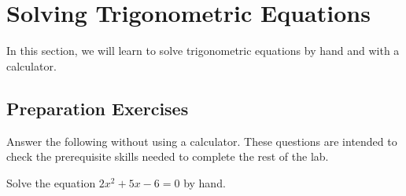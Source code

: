 
\section{Solving Trigonometric Equations} \label{section-solving-trig-equations}
In this section, we will learn to solve trigonometric equations by hand and with a calculator.


\subsection*{Preparation Exercises} \label{preparation-exercises-section-solving-trig-equations}
Answer the following without using a calculator. These questions are intended to check the prerequisite skills needed to complete the rest of the lab.

\begin{myPrep}
	Solve the equation $2x^2+5x-6=0$ by hand.
\end{myPrep}
\vfill

